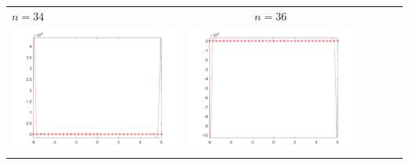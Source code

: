 \begin{tabular}{l*{5}{c}}
\hspace{3.5cm}\(n=34\) &  \(n=36\) \\
\includegraphics[scale=0.5]{cap4/4_9/34.png} &  \includegraphics[scale=0.5]{cap4/4_9/36.png} \\


\end{tabular}
